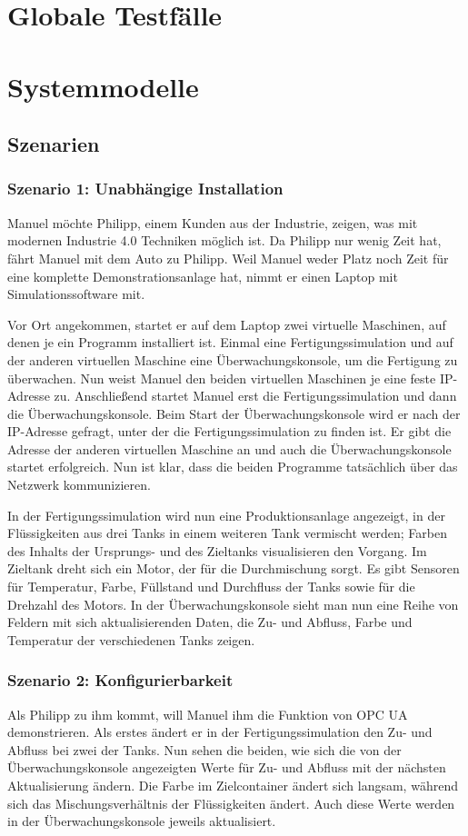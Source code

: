 \documentclass[parskip=full]{scrartcl}
\begin{document}
\section{Globale Testfälle}
\Blindtext[1]

\section{Systemmodelle}
\subsection{Szenarien}
\subsubsection{Szenario 1: Unabhängige Installation}
Manuel möchte Philipp, einem Kunden aus der Industrie, zeigen, was mit modernen Industrie 4.0 Techniken möglich ist.
Da Philipp nur wenig Zeit hat, fährt Manuel mit dem Auto zu Philipp. Weil Manuel weder Platz 
noch Zeit für eine komplette Demonstrationsanlage hat, nimmt er einen Laptop mit Simulationssoftware mit.

Vor Ort angekommen, startet er auf dem Laptop zwei virtuelle Maschinen, auf denen je ein Programm installiert ist. 
Einmal eine Fertigungssimulation und auf der anderen virtuellen Maschine eine Überwachungskonsole, um die Fertigung zu überwachen.
Nun weist Manuel den beiden virtuellen Maschinen je eine feste IP-Adresse zu.
Anschlie{\ss}end startet Manuel erst die Fertigungssimulation und dann die Überwachungskonsole.
Beim Start der Überwachungskonsole wird er nach der IP-Adresse gefragt, unter der die Fertigungssimulation zu finden ist. 
Er gibt die Adresse der anderen virtuellen Maschine an und auch die Überwachungskonsole startet erfolgreich. 
Nun ist klar, dass die beiden Programme tatsächlich über das Netzwerk kommunizieren.

In der Fertigungssimulation wird nun eine Produktionsanlage angezeigt, in der Flüssigkeiten aus drei Tanks
in einem weiteren Tank vermischt werden; Farben des Inhalts der Ursprungs- und des Zieltanks visualisieren den Vorgang. 
Im Zieltank dreht sich ein Motor, der für die Durchmischung sorgt.
Es gibt Sensoren für Temperatur, Farbe, Füllstand und Durchfluss der Tanks sowie für die Drehzahl des Motors.
In der Überwachungskonsole sieht man nun eine Reihe von Feldern mit sich aktualisierenden Daten,
die Zu- und Abfluss, Farbe und Temperatur der verschiedenen Tanks zeigen.

\subsubsection{Szenario 2: Konfigurierbarkeit}
Als Philipp zu ihm kommt, will Manuel ihm die Funktion von OPC UA demonstrieren.
Als erstes ändert er in der Fertigungssimulation den Zu- und Abfluss bei zwei der Tanks. Nun sehen die beiden, wie
sich die von der Überwachungskonsole angezeigten Werte für Zu- und Abfluss mit der nächsten Aktualisierung ändern. Die
Farbe im Zielcontainer ändert sich langsam, während sich das Mischungsverhältnis der Flüssigkeiten ändert. Auch diese
Werte werden in der Überwachungskonsole jeweils aktualisiert.
\end{document}
